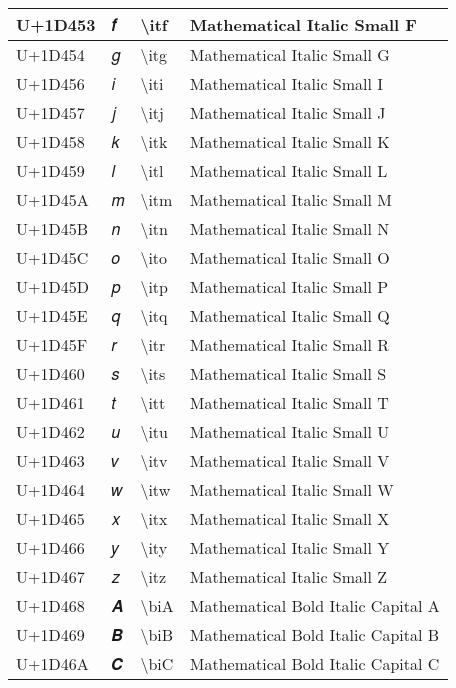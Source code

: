 \begin{table}[h]
\begin{tabulary}{\linewidth}{|L|L|L|L|}
\hline
U+1D453 & 𝑓 & {\textbackslash}itf & Mathematical Italic Small F \\
\hline
U+1D454 & 𝑔 & {\textbackslash}itg & Mathematical Italic Small G \\
\hline
U+1D456 & 𝑖 & {\textbackslash}iti & Mathematical Italic Small I \\
\hline
U+1D457 & 𝑗 & {\textbackslash}itj & Mathematical Italic Small J \\
\hline
U+1D458 & 𝑘 & {\textbackslash}itk & Mathematical Italic Small K \\
\hline
U+1D459 & 𝑙 & {\textbackslash}itl & Mathematical Italic Small L \\
\hline
U+1D45A & 𝑚 & {\textbackslash}itm & Mathematical Italic Small M \\
\hline
U+1D45B & 𝑛 & {\textbackslash}itn & Mathematical Italic Small N \\
\hline
U+1D45C & 𝑜 & {\textbackslash}ito & Mathematical Italic Small O \\
\hline
U+1D45D & 𝑝 & {\textbackslash}itp & Mathematical Italic Small P \\
\hline
U+1D45E & 𝑞 & {\textbackslash}itq & Mathematical Italic Small Q \\
\hline
U+1D45F & 𝑟 & {\textbackslash}itr & Mathematical Italic Small R \\
\hline
U+1D460 & 𝑠 & {\textbackslash}its & Mathematical Italic Small S \\
\hline
U+1D461 & 𝑡 & {\textbackslash}itt & Mathematical Italic Small T \\
\hline
U+1D462 & 𝑢 & {\textbackslash}itu & Mathematical Italic Small U \\
\hline
U+1D463 & 𝑣 & {\textbackslash}itv & Mathematical Italic Small V \\
\hline
U+1D464 & 𝑤 & {\textbackslash}itw & Mathematical Italic Small W \\
\hline
U+1D465 & 𝑥 & {\textbackslash}itx & Mathematical Italic Small X \\
\hline
U+1D466 & 𝑦 & {\textbackslash}ity & Mathematical Italic Small Y \\
\hline
U+1D467 & 𝑧 & {\textbackslash}itz & Mathematical Italic Small Z \\
\hline
U+1D468 & 𝑨 & {\textbackslash}biA & Mathematical Bold Italic Capital A \\
\hline
U+1D469 & 𝑩 & {\textbackslash}biB & Mathematical Bold Italic Capital B \\
\hline
U+1D46A & 𝑪 & {\textbackslash}biC & Mathematical Bold Italic Capital C \\

\end{tabulary}
\end{table}
